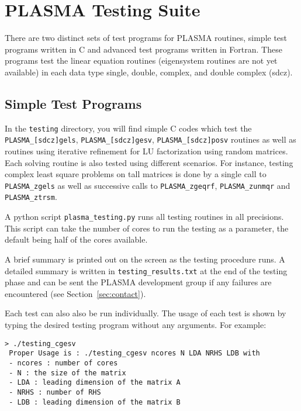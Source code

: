 
\chapter{PLASMA Testing Suite}

There are two distinct sets of test programs for PLASMA routines,
simple test programs written in C and advanced test programs written
in Fortran.  These programs test the linear equation routines
(eigensystem routines are not yet available) in each data type
single, double, complex, and double complex (sdcz).

\section{Simple Test Programs}
In the \texttt{testing} directory, you will find simple C codes which
test the \texttt{PLASMA\_[sdcz]gels}, \texttt{PLASMA\_[sdcz]gesv},
\texttt{PLASMA\_[sdcz]posv} routines as well as routines using iterative refinement 
for LU factorization using random matrices.  Each solving routine is
also tested using different scenarios. For instance, testing complex
least square problems on tall matrices is done by a single call to
\texttt{PLASMA\_zgels} as well as successive calls to \texttt{PLASMA\_zgeqrf},
\texttt{PLASMA\_zunmqr} and \texttt{PLASMA\_ztrsm}.

A python script \texttt{plasma\_testing.py} runs all testing routines
in all precisions. This script can take the number of cores to run the 
testing as a parameter, the default being half of the cores available.

A brief summary is printed out on the screen as the testing procedure runs. A detailed summary is written
in \texttt{testing\_results.txt} at the end of the testing phase and
can be sent the PLASMA development group if any 
failures are encountered (see Section~\ref{sec:contact}).

Each test can also also be run individually. The usage of each test is
shown by typing the desired  
testing program without any arguments. For example:
\begin{verbatim}
> ./testing_cgesv 
 Proper Usage is : ./testing_cgesv ncores N LDA NRHS LDB with 
 - ncores : number of cores 
 - N : the size of the matrix 
 - LDA : leading dimension of the matrix A 
 - NRHS : number of RHS 
 - LDB : leading dimension of the matrix B 
\end{verbatim}

